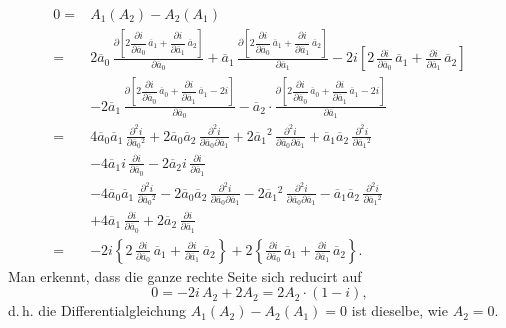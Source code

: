 \[
\begin{aligned}
0 = {}& A_1(A_2) - A_2(A_1)\\
= {}& 2\overline{a}_0\,\frac{\partial\left[2\dfrac{\partial i}{\partial \overline{a}_0}\,\overline{a}_1 + \dfrac{\partial i}{\partial \overline{a}_1}\,\overline{a}_2\right]}{\partial \overline{a}_0} + \overline{a}_1\,\frac{\partial\left[2\dfrac{\partial i}{\partial \overline{a}_0}\,\overline{a}_1 + \dfrac{\partial i}{\partial \overline{a}_1}\,\overline{a}_2\right]}{\partial \overline{a}_1} - 2i\left[2\,\frac{\partial i}{\partial \overline{a}_0}\,\overline{a}_1 + \frac{\partial i}{\partial \overline{a}_1}\,\overline{a}_2\right]\\
& - 2\overline{a}_1\,\frac{\partial\left[2\dfrac{\partial i}{\partial \overline{a}_0}\,\overline{a}_0 + \dfrac{\partial i}{\partial \overline{a}_1}\,\overline{a}_1 - 2i\right]}{\partial \overline{a}_0} - \overline{a}_2\cdot\frac{\partial\left[2\dfrac{\partial i}{\partial \overline{a}_0}\,\overline{a}_0 + \dfrac{\partial i}{\partial \overline{a}_1}\,\overline{a}_1 - 2i\right]}{\partial \overline{a}_1}\\
= {}& 4\overline{a}_0\overline{a}_1\,\frac{\partial^2 i}{\partial \overline{a}_0{}^2} + 2\overline{a}_0\overline{a}_2\,\frac{\partial^2 i}{\partial \overline{a}_0 \partial \overline{a}_1} + 2\overline{a}_1{}^2\,\frac{\partial^2 i}{\partial \overline{a}_0 \partial \overline{a}_1} + \overline{a}_1\overline{a}_2\,\frac{\partial^2 i}{\partial \overline{a}_1{}^2}\\
& - 4\overline{a}_1 i\,\frac{\partial i}{\partial \overline{a}_0} - 2\overline{a}_2 i\,\frac{\partial i}{\partial \overline{a}_1}\\
& - 4\overline{a}_0\overline{a}_1\,\frac{\partial^2 i}{\partial \overline{a}_0{}^2} - 2\overline{a}_0\overline{a}_2\,\frac{\partial^2 i}{\partial \overline{a}_0 \partial \overline{a}_1} - 2\overline{a}_1{}^2\,\frac{\partial^2 i}{\partial \overline{a}_0 \partial \overline{a}_1} - \overline{a}_1\overline{a}_2\,\frac{\partial^2 i}{\partial \overline{a}_1{}^2}\\
& + 4\overline{a}_1\,\frac{\partial i}{\partial \overline{a}_0} + 2\overline{a}_2\,\frac{\partial i}{\partial \overline{a}_1}\\
= {}& -2i\left\{2\,\frac{\partial i}{\partial \overline{a}_0}\,\overline{a}_1 + \frac{\partial i}{\partial \overline{a}_1}\,\overline{a}_2\right\} + 2\left\{\frac{\partial i}{\partial \overline{a}_0}\,\overline{a}_1 + \frac{\partial i}{\partial \overline{a}_1}\,\overline{a}_2\right\}.
\end{aligned}
\]
Man erkennt, dass die ganze rechte Seite sich reducirt auf
\[
0 = -2i\,A_2 + 2A_2 = 2A_2\cdot(1-i),
\]
d.\,h. die Differentialgleichung $A_1(A_2) - A_2(A_1) = 0$ ist dieselbe, wie
$A_2 = 0$.

